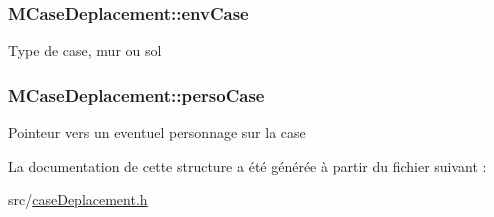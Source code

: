 \subsubsection[{\texorpdfstring{env\+Case}{envCase}}]{\setlength{\rightskip}{0pt plus 5cm}M\+Case\+Deplacement\+::env\+Case}\hypertarget{structMCaseDeplacement_a39fe908c7afa0eb210c77d12bb96a99e}{}\label{structMCaseDeplacement_a39fe908c7afa0eb210c77d12bb96a99e}
Type de case, mur ou sol 
\subsubsection[{\texorpdfstring{perso\+Case}{persoCase}}]{\setlength{\rightskip}{0pt plus 5cm}M\+Case\+Deplacement\+::perso\+Case}\hypertarget{structMCaseDeplacement_a4c1dce63d49728610cc667865d0661e2}{}\label{structMCaseDeplacement_a4c1dce63d49728610cc667865d0661e2}
Pointeur vers un eventuel personnage sur la case 

La documentation de cette structure a été générée à partir du fichier suivant \+:\begin{DoxyCompactItemize}
\item 
src/\hyperlink{caseDeplacement_8h}{case\+Deplacement.\+h}\end{DoxyCompactItemize}
